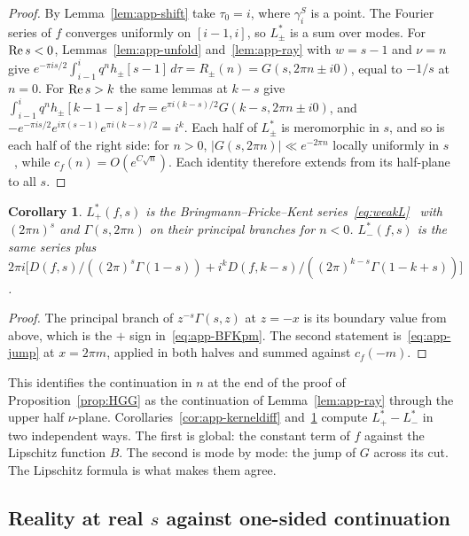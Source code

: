 \documentclass[11pt]{article}
\newtheorem{corollary}[theorem]{Corollary}
\begin{document}
\begin{proof}
By Lemma~\ref{lem:app-shift} take $\tau_0=i$, where $\gamma^S_i$ is a point. The Fourier series of
$f$ converges uniformly on $[i-1,i]$, so $L^*_\pm$ is a sum over modes. For ${\rm Re}\,s<0$,
Lemmas~\ref{lem:app-unfold} and~\ref{lem:app-ray} with $w=s-1$ and $\nu=n$ give
$e^{-\pi is/2}\int_{i-1}^{i}q^n h_\pm[s-1]\,d\tau=R_\pm(n)=G(s,2\pi n\pm i0)$, equal to $-1/s$ at
$n=0$. For ${\rm Re}\,s>k$ the same lemmas at $k-s$ give
$\int_{i-1}^{i}q^n h_\pm[k-1-s]\,d\tau=e^{\pi i(k-s)/2}G(k-s,2\pi n\pm i0)$, and
$-e^{-\pi is/2}e^{i\pi(s-1)}e^{\pi i(k-s)/2}=i^k$. Each half of $L^*_\pm$ is meromorphic in $s$, and
so is each half of the right side: for $n>0$, $|G(s,2\pi n)|\ll e^{-2\pi n}$ locally uniformly in
$s$~\cite[\S8.11]{DLMF}, while $c_f(n)=O(e^{C\sqrt n})$. Each identity therefore extends from its
half-plane to all $s$.
\end{proof}

\begin{corollary}\label{cor:app-BFK}
$L^*_+(f,s)$ is the Bringmann--Fricke--Kent series~\eqref{eq:weakL}~\cite{BFK2011} with $(2\pi n)^s$ and
$\Gamma(s,2\pi n)$ on their principal branches for $n<0$. $L^*_-(f,s)$ is the same series plus
$2\pi i\big[D(f,s)/((2\pi)^s\Gamma(1-s))+i^kD(f,k-s)/((2\pi)^{k-s}\Gamma(1-k+s))\big]$.
\end{corollary}

\begin{proof}
The principal branch of $z^{-s}\Gamma(s,z)$ at $z=-x$ is its boundary value from above, which is
the $+$ sign in~\eqref{eq:app-BFKpm}. The second statement is~\eqref{eq:app-jump} at $x=2\pi m$,
applied in both halves and summed against $c_f(-m)$.
\end{proof}

This identifies the continuation in $n$ at the end of the proof of Proposition~\ref{prop:HGG} as
the continuation of Lemma~\ref{lem:app-ray} through the upper half $\nu$-plane.
Corollaries~\ref{cor:app-kerneldiff} and~\ref{cor:app-BFK} compute $L^*_+-L^*_-$ in two independent
ways. The first is global: the constant term of $f$ against the Lipschitz function $B$. The second
is mode by mode: the jump of $G$ across its cut. The Lipschitz formula is what makes them agree.

\subsection{Reality at real $s$ against one-sided continuation}
\end{document}
